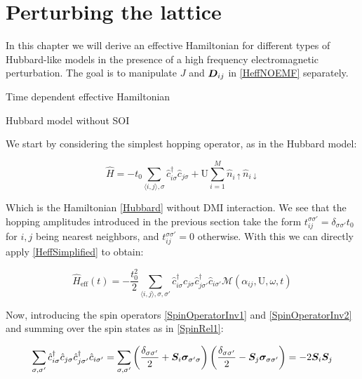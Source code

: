 \chapter{Perturbing the lattice}

In this chapter we will derive an effective Hamiltonian for different types of Hubbard-like models in the presence of a high frequency electromagnetic perturbation. The goal is to manipulate $J$ and $\boldsymbol{D}_{ij}$ in \ref{HeffNOEMF} separately.

\begin{section}{Time dependent effective Hamiltonian}



\end{section}

\begin{section}{Hubbard model without SOI}

We start by considering the simplest hopping operator, as in the Hubbard model:

\begin{equation}
\hat{H} = -t_0\sum_{\langle i,j \rangle, \sigma} \hat{c}_{i \sigma}^\dagger \hat{c}_{j \sigma} + \text{U} \sum_{i=1}^M \hat{n}_{i\uparrow}\hat{n}_{i\downarrow}
\end{equation}

Which is the Hamiltonian \ref{Hubbard} without DMI interaction. We see that the hopping amplitudes introduced in the previous section take the form $t_{ij}^{\sigma \sigma'} = \delta_{\sigma \sigma'} t_0$ for $i,j$ being nearest neighbors, and $t_{ij}^{\sigma \sigma'} = 0$ otherwise. With this we can directly apply \ref{HeffSimplified} to obtain:

\begin{equation}
\hat{H}_{\text{eff}}(t) = -\frac{t_0^2}{2} \sum_{\langle i,j \rangle, \sigma, \sigma'} \hat{c}_{i \sigma}^\dagger \hat{c}_{j \sigma} \hat{c}_{j \sigma'}^\dagger \hat{c}_{i \sigma'} \mathcal{M}(\alpha_{ij}, \text{U}, \omega, t)
\end{equation}

Now, introducing the spin operators \ref{SpinOperatorInv1} and \ref{SpinOperatorInv2} and summing over the spin states as in \ref{SpinRel1}:

\begin{align*}
\sum_{\sigma, \sigma'} \hat{c}_{i \sigma}^\dagger \hat{c}_{j \sigma} \hat{c}_{j \sigma'}^\dagger \hat{c}_{i \sigma'} = \sum_{\sigma, \sigma'} \left( \frac{\delta_{\sigma \sigma'}}{2} + \boldsymbol{S}_i\boldsymbol{\sigma}_{\sigma' \sigma} \right) \left( \frac{\delta_{\sigma \sigma'}}{2} - \boldsymbol{S}_j\boldsymbol{\sigma}_{\sigma \sigma'} \right) = -2\boldsymbol{S}_i \boldsymbol{S}_j
\end{align*}


\end{section}
